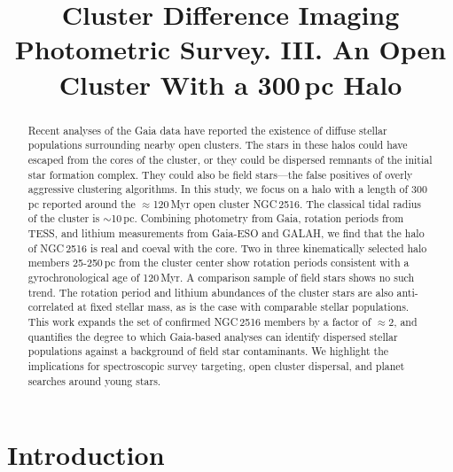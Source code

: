 \documentclass[12pt,twocolumn,tighten]{aastex63}
\begin{document}

\title{
  Cluster Difference Imaging Photometric Survey. III.
  An Open Cluster With a 300\,pc Halo
}



\begin{abstract}
  Recent analyses of the Gaia data have reported the existence of
  diffuse stellar populations surrounding nearby open clusters. 
  The stars in these halos could have escaped from the cores of the
  cluster, or they could be dispersed remnants of the initial star formation complex.
  They could also be field stars---the false positives of overly
  aggressive clustering algorithms.
  In this study, we focus on a halo with a length of 300\,pc reported
  around the $\approx$120\,Myr open cluster NGC\,2516.
  The classical tidal radius of the cluster is $\sim$10\,pc.
  Combining photometry from Gaia, rotation periods from TESS, and
  lithium measurements from Gaia-ESO and GALAH, we find that the halo
  of NGC\,2516 is real and coeval with the core.
  Two in three kinematically selected halo members 25-250\,pc from the
  cluster center show rotation periods consistent with a
  gyrochronological age of 120\,Myr.
  A comparison sample of field stars shows no such trend.
  The rotation period and lithium abundances of the cluster stars are
  also anti-correlated at fixed stellar mass, as is the case with
  comparable stellar populations.
  This work expands the set of confirmed NGC\,2516 members by a factor
  of $\approx$2, and quantifies the degree to which Gaia-based
  analyses can identify dispersed stellar populations against a
  background of field star contaminants.
  We highlight the implications for spectroscopic survey targeting,
  open cluster dispersal, and planet searches around young stars.
\end{abstract}





\section{Introduction}
\end{document}
